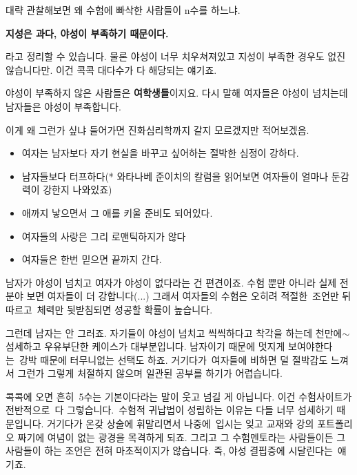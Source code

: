대략 관찰해보면 왜 수험에 빠삭한 사람들이 n수를 하느냐.
\vspace{5mm}

\textbf{지성은 과다, 야성이 부족하기 때문이다.}
\vspace{5mm}

라고 정리할 수 있습니다. 물론 야성이 너무 치우쳐져있고 지성이 부족한 경우도 없진 않습니다만.
이건 콕콕 대다수가 다 해당되는 얘기죠.
\vspace{5mm}

야성이 부족하지 않은 사람들은 \textbf{여학생들}이지요.
다시 말해 여자들은 야성이 넘치는데 남자들은 야성이 부족합니다.
\vspace{5mm}

이게 왜 그런가 싶냐 들어가면 진화심리학까지 갈지 모르겠지만 적어보겠음.
\begin{itemize}
    \item 여자는 남자보다 자기 현실을 바꾸고 싶어하는 절박한 심정이 강하다.
    \item 남자들보다 터프하다(* 와타나베 준이치의 칼럼을 읽어보면 여자들이 얼마나 둔감력이 강한지 나와있죠)
    \item 애까지 낳으면서 그 애를 키울 준비도 되어있다.
    \item 여자들의 사랑은 그리 로맨틱하지가 않다
    \item 여자들은 한번 믿으면 끝까지 간다.
\end{itemize}
\vspace{5mm}

남자가 야성이 넘치고 여자가 야성이 없다라는 건 편견이죠. 수험 뿐만 아니라 실제 전분야 보면 여자들이 더 강합니다(...)
그래서 여자들의 수험은 오히려 적절한 조언만 뒤따르고 체력만 뒷받침되면 성공할 확률이 높습니다.
\vspace{5mm}

그런데 남자는 안 그러죠. 자기들이 야성이 넘치고 씩씩하다고 착각을 하는데 천만에$\sim$
섬세하고 우유부단한 케이스가 대부분입니다. 남자이기 때문에 멋지게 보여야한다는 강박 때문에 터무니없는 선택도 하죠.
거기다가 여자들에 비하면 덜 절박감도 느껴서 그런가 그렇게 처절하지 않으며 일관된 공부를 하기가 어렵습니다.
\vspace{5mm}

콕콕에 오면 흔히 5수는 기본이다라는 말이 웃고 넘길 게 아닙니다.
이건 수험사이트가 전반적으로 다 그렇습니다. 수험적 귀납법이 성립하는 이유는 다들 너무 섬세하기 때문입니다.
거기다가 온갖 상술에 휘말리면서 나중에 입시는 잊고 교재와 강의 포트폴리오 짜기에 여념이 없는 광경을 목격하게 되죠.
그리고 그 수험멘토라는 사람들이든 그 사람들이 하는 조언은 전혀 마초적이지가 않습니다. 즉, 야성 결핍증에 시달린다는 얘기죠.
\vspace{5mm}

